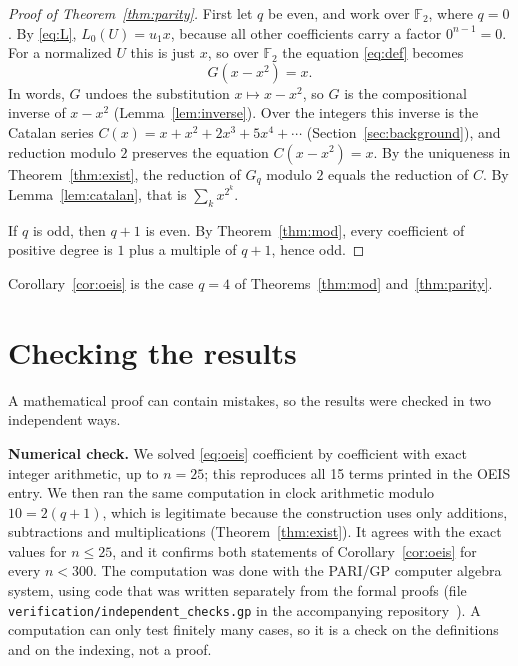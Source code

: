 \documentclass[11pt,a4paper]{article}
\theoremstyle{definition}
\theoremstyle{remark}
\newcommand{\F}{\mathbb{F}}
\newcommand{\para}[1]{\par\medskip\noindent\textbf{#1}\enspace}
\begin{document}
\begin{proof}[Proof of Theorem~\ref{thm:parity}]
First let $q$ be even, and work over $\F_2$, where $q=0$. By \eqref{eq:L}, $L_0(U)=u_1x$, because all other
coefficients carry a factor $0^{n-1}=0$. For a normalized $U$ this is just $x$, so over $\F_2$ the equation
\eqref{eq:def} becomes
\[
G(x-x^2)=x .
\]
In words, $G$ undoes the substitution $x\mapsto x-x^2$, so $G$ is the compositional inverse of $x-x^2$
(Lemma~\ref{lem:inverse}). Over the integers this inverse is the Catalan series $C(x)=x+x^2+2x^3+5x^4+\cdots$
(Section~\ref{sec:background}), and reduction modulo $2$ preserves the equation $C(x-x^2)=x$. By the uniqueness in
Theorem~\ref{thm:exist}, the reduction of $G_q$ modulo $2$ equals the reduction of $C$. By Lemma~\ref{lem:catalan}, that
is $\sum_kx^{2^k}$.

If $q$ is odd, then $q+1$ is even. By Theorem~\ref{thm:mod}, every coefficient of positive degree is $1$ plus a multiple
of $q+1$, hence odd.
\end{proof}


Corollary~\ref{cor:oeis} is the case $q=4$ of Theorems~\ref{thm:mod} and~\ref{thm:parity}.

\section{Checking the results}\label{sec:checks}

A mathematical proof can contain mistakes, so the results were checked in two independent ways.

\para{Numerical check.}
We solved \eqref{eq:oeis} coefficient by coefficient with exact integer arithmetic, up to $n=25$; this
reproduces all 15 terms printed in the OEIS entry. We then ran the same computation in clock
arithmetic modulo $10=2(q+1)$, which is legitimate because the construction uses only additions,
subtractions and multiplications (Theorem~\ref{thm:exist}). It agrees with the exact values for $n\le25$, and it confirms
both statements of Corollary~\ref{cor:oeis} for every $n<300$.
The computation was done with the PARI/GP computer algebra system, using code that was written separately from the
formal proofs (file \texttt{verification/independent\_checks.gp} in the accompanying repository~\cite{repo}).
A computation can only test finitely many cases, so it is a check on the definitions and on the indexing, not a proof.
\end{document}
